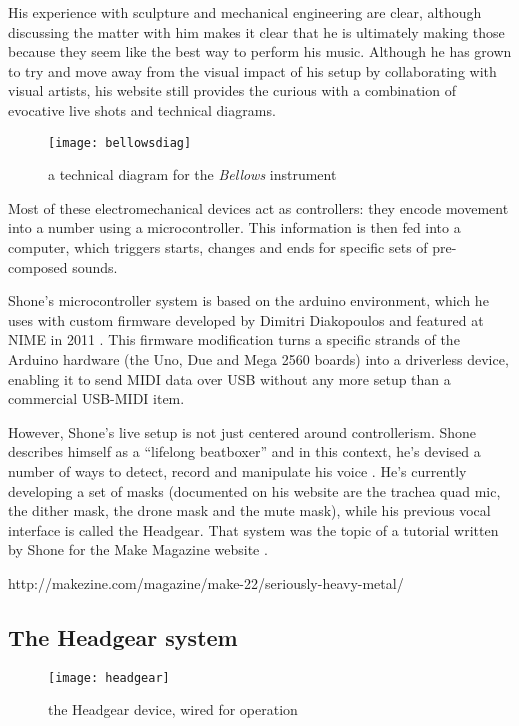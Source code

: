 His experience with sculpture and mechanical engineering are clear, although discussing the matter with him makes it clear that he is ultimately making those because they seem like the best way to perform his music. Although he has grown to try and move away from the visual impact of his setup by collaborating with visual artists, his website still provides the curious with a combination of evocative live shots and technical diagrams. 

	\begin{figure}[h!]
	  \caption{a technical diagram for the \emph{Bellows} instrument}
	  \centering
	    \texttt{[image: bellowsdiag]}
	\end{figure}
	
Most of these electromechanical devices act as controllers: they encode movement into a number using a microcontroller. This information is then fed into a computer, which triggers starts, changes and ends for specific sets of pre-composed sounds. 

Shone's microcontroller system is based on the arduino environment, which he uses with custom firmware developed by Dimitri Diakopoulos and featured at NIME in 2011 \citep{diakopoulos2011,diakopoulos2015} . This firmware modification turns a specific strands of the Arduino hardware (the Uno, Due and Mega 2560 boards) into a driverless device, enabling it to send MIDI data over USB without any more setup than a commercial USB-MIDI item. 

However, Shone's live setup is not just centered around controllerism. Shone describes himself as a ``lifelong beatboxer'' and in this context, he's devised a number of ways to detect, record and manipulate his voice \citep{shone2012}. He's currently developing a set of masks (documented on his website are the trachea quad mic, the dither mask, the drone mask and the mute mask), while his previous vocal interface is called the Headgear. That system was the topic of a tutorial written by Shone for the Make Magazine website \citep{shone2012}. 

http://makezine.com/magazine/make-22/seriously-heavy-metal/

\subsection{The Headgear system}

	\begin{figure}[h!]
	  \caption{the Headgear device, wired for operation}
	  \centering
	    \texttt{[image: headgear]}
	\end{figure}


